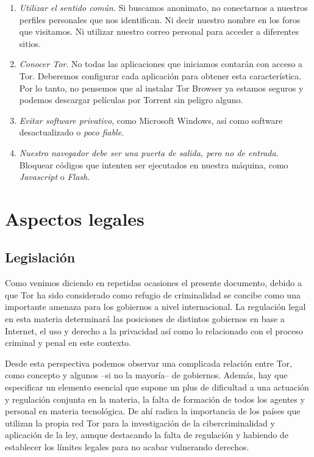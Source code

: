 \documentclass[a4paper, 11pt, titlepage]{article}
\begin{document}
            \begin{enumerate}
                \item \emph{Utilizar el sentido común}. Si buscamos anonimato, no conectarnos a nuestros perfiles 
                personales que nos identifican. Ni decir nuestro nombre en los foros que visitamos. Ni utilizar nuestro 
                correo personal para acceder a diferentes sitios.
                \item \emph{Conocer Tor}. No todas las aplicaciones que iniciamos contarán con acceso a Tor. Deberemos 
                configurar cada aplicación para obtener esta característica. Por lo tanto, no pensemos que al instalar 
                Tor Browser ya estamos seguros y podemos descargar películas por Torrent sin peligro alguno.
                \item \emph{Evitar software privativo}, como Microsoft Windows, así como software desactualizado o 
                \emph{poco fiable}.
                \item \emph{Nuestro navegador debe ser una puerta de salida, pero no de entrada}. Bloquear códigos que 
                intenten ser ejecutados en nuestra máquina, como \emph{Javascript} o \emph{Flash}.
            \end{enumerate}

\section{Aspectos legales}

    \subsection{Legislación}

        Como venimos diciendo en repetidas ocasiones el presente documento, debido a que Tor ha sido considerado como 
        refugio de criminalidad se concibe como una importante amenaza para los gobiernos a nivel internacional. La 
        regulación legal en esta materia determinará las posiciones de distintos gobiernos en base a Internet, el uso y 
        derecho a la privacidad así como lo relacionado con el proceso criminal y penal en este contexto.

        Desde esta perspectiva podemos observar una complicada relación entre Tor, como concepto y algunos --si no la 
        mayoría-- de gobiernos. Además, hay que especificar un elemento esencial que supone un plus de dificultad a una 
        actuación y regulación conjunta en la  materia, la falta de formación de todos los agentes y personal en materia 
        tecnológica. De ahí radica la importancia de  los  países  que  utilizan la propia red Tor para la investigación 
        de la cibercriminalidad y aplicación de la ley,  aunque destacando la falta de regulación  y habiendo de  
        establecer los límites legales para no acabar vulnerando derechos. 
\end{document}
